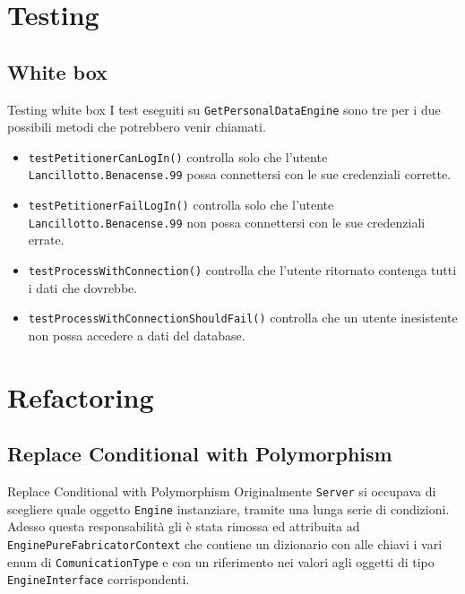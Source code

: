 \documentclass{beamer}
\begin{document}
\section{Testing}
\subsection{White box}
\begin{frame}{Testing white box}
\quad I test eseguiti su \texttt{GetPersonalDataEngine} sono tre per i due possibili metodi che potrebbero venir chiamati.
\begin{itemize}
\item \texttt{testPetitionerCanLogIn()} controlla solo che l'utente \texttt{Lancillotto.Benacense.99} possa connettersi con le sue credenziali corrette.
\item \texttt{testPetitionerFailLogIn()} controlla solo che l'utente \texttt{Lancillotto.Benacense.99} non possa connettersi con le sue credenziali errate.
\item \texttt{testProcessWithConnection()} controlla che l'utente ritornato contenga tutti i dati che dovrebbe.
\item \texttt{testProcessWithConnectionShouldFail()} controlla che un utente inesistente non possa accedere a dati del database.
\end{itemize}
\end{frame}


\section{Refactoring}
\subsection{Replace Conditional with Polymorphism}
\begin{frame}{Replace Conditional with Polymorphism}
\quad Originalmente \texttt{Server} si occupava di scegliere quale oggetto \texttt{Engine} instanziare, tramite una lunga serie di condizioni.
Adesso questa responsabilità gli è stata rimossa ed attribuita ad \texttt{EnginePureFabricatorContext} che contiene un dizionario con alle chiavi i vari enum di \texttt{ComunicationType} e con un riferimento nei valori agli oggetti di tipo \texttt{EngineInterface} corrispondenti.  
\end{frame}
\end{document}
